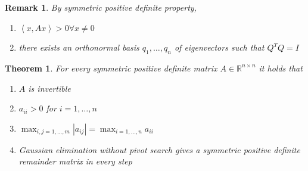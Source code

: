 \documentclass[a4paper]{article}
\newcounter{lecref}[section]
\numberwithin{lecref}{section}
\theoremstyle{break}
\newtheorem{thm}[lecref]{Theorem}
\newtheorem*{Remark}{Remark}
\newcommand{\Abs}[1]{\left|#1\right|}
\newcommand{\IP}[2]{\left\langle#1, #2\right\rangle}
\begin{document}
\begin{Remark}
  By symmetric positive definite property,
  \begin{enumerate}
    \item $\IP{x}{Ax} > 0 \forall x \neq 0$
    \item there exists an orthonormal basis $q_1, \dots, q_n$ of eigenvectors such that $Q^T Q = I$
  \end{enumerate}
\end{Remark}

\begin{thm}
  \label{theorem:1-6}
  For every symmetric positive definite matrix $A \in \mathbb R^{n \times n}$ it holds that
  \begin{enumerate}
    \item $A$ is invertible
    \item $a_{ii} > 0$ for $i = 1, \dots, n$
    \item $\max_{i,j=1,\dots,m} \Abs{a_{ij}} = \max_{i=1,\dots,n} a_{ii}$
    \item Gaussian elimination without pivot search gives a symmetric positive definite remainder matrix in every step
  \end{enumerate}
\end{thm}
\end{document}
